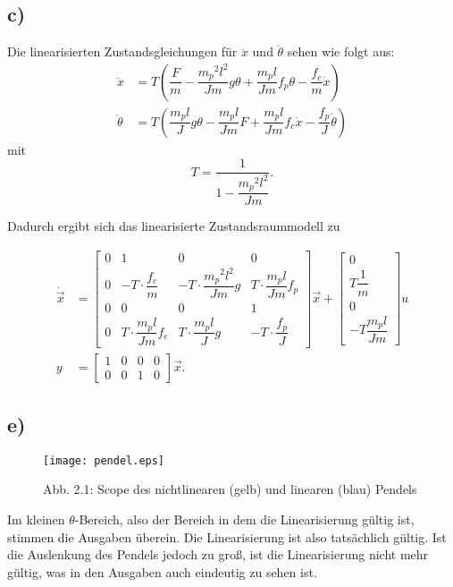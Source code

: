 \documentclass[11pt]{scrartcl} %
\begin{document}
\subsection*{c)}
Die linearisierten Zustandsgleichungen für $\ddot{x}$ und $\ddot{\theta}$ sehen wie folgt aus:
\begin{align*}
\ddot{x} &= T \left( \dfrac{F}{m} - \dfrac{{m_p}^2l^2}{Jm}g\theta + \dfrac{m_pl}{Jm}f_p\theta - \dfrac{f_c}{m} \dot{x} \right)\\[15pt]
\ddot{\theta} &= T \left( \dfrac{m_pl}{J} g \theta - \dfrac{m_pl}{Jm}F + \dfrac{m_pl}{Jm} f_c \dot{x} - \dfrac{f_p}{J} \dot{\theta} \right)
\end{align*}
mit
\begin{equation*}
T = \dfrac{1}{1 - \dfrac{{m_p}^2l^2}{Jm}}.
\end{equation*}

Dadurch ergibt sich das linearisierte Zustandsraummodell zu

\begin{align*}
\dot{\vec{x}} &= 
\begin{bmatrix}
0 & 1 & 0 & 0\\
0 & -T \cdot \dfrac{f_c}{m} & -T \cdot \dfrac{{m_p}^2l^2}{Jm}g & T \cdot \dfrac{m_p l}{Jm}f_p\\
0 & 0 & 0 & 1\\
0 & T \cdot \dfrac{m_p l}{Jm}f_c & T \cdot \dfrac{m_p l}{J}g & -T \cdot \dfrac{f_p}{J}
\end{bmatrix} 
\vec{x}
+
\begin{bmatrix}
0\\
T\dfrac{1}{m}\\
0\\
-T\dfrac{m_pl}{Jm}
\end{bmatrix}
u
\\[25pt]
y &= 
\begin{bmatrix}
1 & 0 & 0 & 0\\
0 & 0 & 1 & 0
\end{bmatrix}
\vec{x}.
\end{align*}

\subsection*{e)}

\begin{figure}[H]
	\centering
	\texttt{[image: pendel.eps]}
	\captionsetup{labelformat=empty}
	\caption{Abb. 2.1: Scope des nichtlinearen (gelb) und linearen (blau) Pendels}
\end{figure}

Im kleinen $\theta$-Bereich, also der Bereich in dem die Linearisierung gültig ist, stimmen die Ausgaben überein. Die Linearisierung ist also tatsächlich gültig. Ist die Auslenkung des Pendels jedoch zu groß, ist die Linearisierung nicht mehr gültig, was in den Ausgaben auch eindeutig zu sehen ist.
\end{document}
